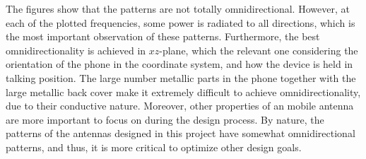 The figures show that the patterns are not totally omnidirectional. However, at each of the plotted frequencies, some power is radiated to all directions, which is the most important observation of these patterns. Furthermore, the best omnidirectionality is achieved in $xz$-plane, which the relevant one considering the orientation of the phone in the coordinate system, and how the device is held in talking position. The large number metallic parts in the phone together with the large metallic back cover make it extremely difficult to achieve omnidirectionality, due to their conductive nature. Moreover, other properties of an mobile antenna are more important to focus on during the design process. By nature, the patterns of the antennas designed in this project have somewhat omnidirectional patterns, and thus, it is more critical to optimize other design goals.
\clearpage